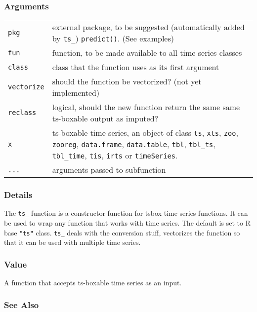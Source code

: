 \documentclass[
  letterpaper,
  DIV=11,
  numbers=noendperiod]{scrreport}
\begin{document}
\subsubsection{Arguments}\label{arguments-82}

\begin{longtable}[]{@{}ll@{}}
\toprule\noalign{}
\endhead
\bottomrule\noalign{}
\endlastfoot
\texttt{pkg} & external package, to be suggested (automatically added by
\texttt{ts\_}) \texttt{predict()}. (See examples) \\
\texttt{fun} & function, to be made available to all time series
classes \\
\texttt{class} & class that the function uses as its first argument \\
\texttt{vectorize} & should the function be vectorized? (not yet
implemented) \\
\texttt{reclass} & logical, should the new function return the same same
ts-boxable output as imputed? \\
\texttt{x} & ts-boxable time series, an object of class \texttt{ts},
\texttt{xts}, \texttt{zoo}, \texttt{zooreg}, \texttt{data.frame},
\texttt{data.table}, \texttt{tbl}, \texttt{tbl\_ts}, \texttt{tbl\_time},
\texttt{tis}, \texttt{irts} or \texttt{timeSeries}. \\
\texttt{...} & arguments passed to subfunction \\
\end{longtable}

\subsubsection{Details}\label{details-20}

The \texttt{ts\_} function is a constructor function for tsbox time
series functions. It can be used to wrap any function that works with
time series. The default is set to R base \texttt{"ts"} class.
\texttt{ts\_} deals with the conversion stuff,
\textquotesingle vectorizes\textquotesingle{} the function so that it
can be used with multiple time series.

\subsubsection{Value}\label{value-69}

A function that accepts ts-boxable time series as an input.

\subsubsection{See Also}\label{see-also-5}
\end{document}
